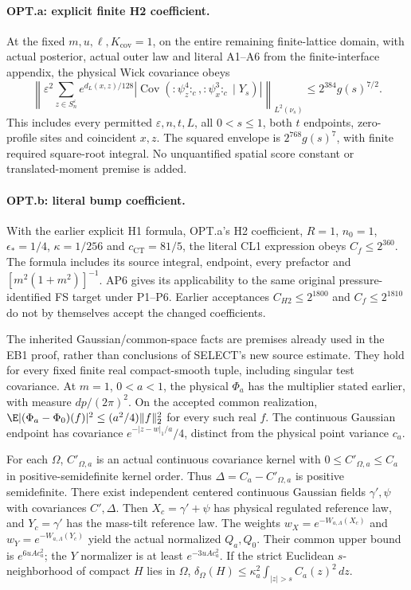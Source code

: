 \paragraph{OPT.a: explicit finite H2 coefficient.}
At the fixed $m,u,\ell,K_{\mathrm{cov}}=1$, on the entire remaining
finite-lattice domain, with actual posterior, actual outer law and literal
A1--A6 from the finite-interface appendix, the physical Wick covariance obeys
\[
 \left\|\varepsilon^2\sum_{z\in S_n^\varepsilon}e^{d_L(x,z)/128}
 \left|\operatorname{Cov}({:}\psi_z^4{:}_c,{:}\psi_x^3{:}_c\mid Y_s)\right|
 \right\|_{L^2(\nu_s)}\le2^{384}g(s)^{7/2}.
\]
This includes every permitted $\varepsilon,n,t,L$, all $0<s\le1$, both
$t$ endpoints, zero-profile sites and coincident $x,z$.
The squared envelope is $2^{768}g(s)^7$, with finite required square-root
integral. No unquantified spatial score constant or translated-moment
premise is added.

\paragraph{OPT.b: literal bump coefficient.}
With the earlier explicit H1 formula, OPT.a's H2 coefficient, $R=1$,
$n_0=1$, $\epsilon_*=1/4$, $\kappa=1/256$ and $c_{\mathrm{CT}}=81/5$,
the literal CL1 expression obeys $C_f\le2^{360}$.
The formula includes its source integral, endpoint, every prefactor and
$[m^2(1+m^2)]^{-1}$. AP6 gives its applicability to the same original
pressure-identified FS target under P1--P6. Earlier acceptances
$C_{H2}\le2^{1800}$ and $C_f\le2^{1810}$ do not by themselves accept
the changed coefficients.

The inherited Gaussian/common-space facts are premises already used in
the EB1 proof, rather than conclusions of SELECT's new source estimate.
They hold for every fixed finite real compact-smooth tuple, including
singular test covariance. At $m=1$, $0<a<1$, the physical $\Phi_a$ has
the multiplier stated earlier, with measure $dp/(2\pi)^2$.
On the accepted common realization,
$\E|(\Phi_a-\Phi_0)(f)|^2\le(a^2/4)\|f\|_2^2$ for every such real $f$.
The continuous Gaussian endpoint has covariance $e^{-|z-w|_1/a}/4$,
distinct from the physical point variance $c_a$.

For each $\Omega$, $C'_{\Omega,a}$ is an actual continuous covariance
kernel with $0\le C'_{\Omega,a}\le C_a$ in positive-semidefinite kernel
order. Thus $\Delta=C_a-C'_{\Omega,a}$ is positive semidefinite.
There exist independent centered continuous Gaussian fields $\gamma',\psi$
with covariances $C',\Delta$. Then $X_c=\gamma'+\psi$ has physical
regulated reference law, and $Y_c=\gamma'$ has the mass-tilt reference law.
The weights $w_X=e^{-W_{a,\Lambda}(X_c)}$ and
$w_Y=e^{-W_{a,\Lambda}(Y_c)}$ yield the actual normalized $Q_a,Q_0$.
Their common upper bound is $e^{6uAc_a^2}$; the $Y$ normalizer is at least
$e^{-3uAc_a^2}$. If the strict Euclidean $s$-neighborhood of compact $H$
lies in $\Omega$,
$\delta_\Omega(H)\le\kappa_a^2\int_{|z|>s}C_a(z)^2\,dz$.

